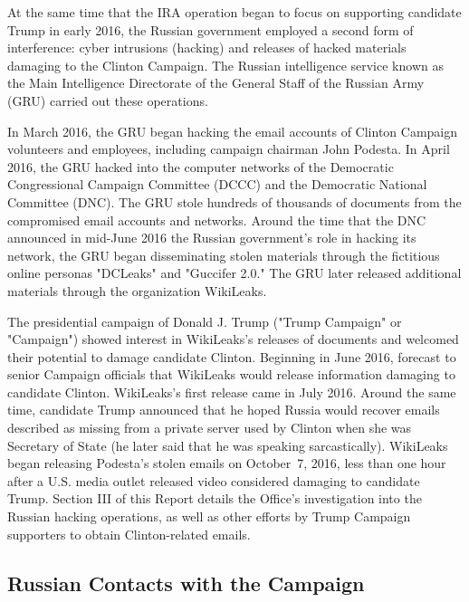 At the same time that the IRA operation began to focus on supporting candidate Trump in early 2016, the Russian government employed a second form of interference: cyber intrusions (hacking) and releases of hacked materials damaging to the Clinton Campaign.
The Russian intelligence service known as the Main Intelligence Directorate of the General Staff of the Russian Army (GRU) carried out these operations.

In March 2016, the GRU began hacking the email accounts of Clinton Campaign volunteers and employees, including campaign chairman John Podesta.
In April 2016, the GRU hacked into the computer networks of the Democratic Congressional Campaign Committee (DCCC) and the Democratic National Committee (DNC).
The GRU stole hundreds of thousands of documents from the compromised email accounts and networks.
Around the time that the DNC announced in mid-June 2016 the Russian government's role in hacking its network, the GRU began disseminating stolen materials through the fictitious online personas "DCLeaks" and "Guccifer 2.0."
The GRU later released additional materials through the organization WikiLeaks.

The presidential campaign of Donald J. Trump ("Trump Campaign" or "Campaign") showed interest in WikiLeaks's releases of documents and welcomed their potential to damage candidate Clinton. Beginning in June 2016,  forecast to senior Campaign officials that WikiLeaks would release information damaging to candidate Clinton.
WikiLeaks's first release came in July 2016.
Around the same time, candidate Trump announced that he hoped Russia would recover emails described as missing from a private server used by Clinton when she was Secretary of State (he later said that he was speaking sarcastically).
 WikiLeaks began releasing Podesta's stolen emails on October~7, 2016, less than one hour after a U.S. media outlet released video considered damaging to candidate Trump.
Section III of this Report details the Office's investigation into the Russian hacking operations, as well as other efforts by Trump Campaign supporters to obtain Clinton-related emails.

\subsection*{Russian Contacts with the Campaign}

